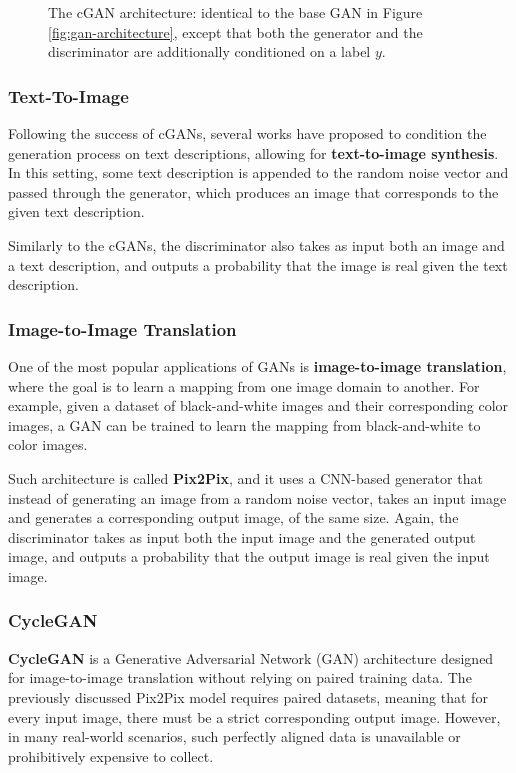 \begin{figure}[H]
    \centering
    \resizebox{0.85\textwidth}{!}{}
    \caption{The cGAN architecture: identical to the base GAN in Figure \ref{fig:gan-architecture}, except that both the generator and the discriminator are additionally conditioned on a label $y$.}
    \label{fig:cgan-architecture}
\end{figure}

\subsubsection{Text-To-Image}
Following the success of cGANs, several works have proposed to condition the generation process on text descriptions, allowing for \textbf{text-to-image synthesis}.
In this setting, some text description is appended to the random noise vector and passed through the generator, which produces an image that corresponds to the given text description.

Similarly to the cGANs, the discriminator also takes as input both an image and a text description, and outputs a probability that the image is real given the text description.

\subsubsection{Image-to-Image Translation}
One of the most popular applications of GANs is \textbf{image-to-image translation}, where the goal is to learn a mapping from one image domain to another.
For example, given a dataset of black-and-white images and their corresponding color images, a GAN can be trained to learn the mapping from black-and-white to color images.

Such architecture is called \textbf{Pix2Pix}, and it uses a CNN-based generator that instead of generating an image from a random noise vector, takes an input image and generates a corresponding output image,
of the same size.
Again, the discriminator takes as input both the input image and the generated output image, and outputs a probability that the output image is real given the input image.

\subsubsection{CycleGAN}
\textbf{CycleGAN} is a Generative Adversarial Network (GAN) architecture designed for image-to-image translation without relying on paired training data. 
The previously discussed Pix2Pix model requires paired datasets, meaning that for every input image, there must be a strict corresponding output image. 
However, in many real-world scenarios, such perfectly aligned data is unavailable or prohibitively expensive to collect.

